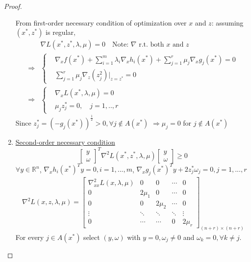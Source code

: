 \documentclass[11pt,a4paper]{article}
\begin{document}
\begin{proof}
\begin{enumerate}[(1)]
    From first-order necessary condition of optimization over $x$ and $z$: assuming $(x^*,z^*)$ is regular,
    \begin{equation}
        \begin{aligned}
            &\nabla L(x^*,z^*,\lambda,\mu)=0\quad \text{Note: $\nabla$ r.t. both $x$ and $z$}\\
            \Rightarrow	&
            \left\{\begin{matrix}
                &\nabla_x f(x^*)+\sum_{i=1}^m \lambda_i \nabla_x h_i(x^*)+\sum_{j=1}^r \mu_j \nabla_x g_j(x^*)=0\\
                &\sum_{j=1}^r \mu_j \nabla_z (z_j^2)|_{z=z^*}=0
            \end{matrix}\right.\\
            \Rightarrow	&
            \left\{\begin{matrix}
                &\nabla_x L(x^*,\lambda,\mu)=0\\
                &\mu_jz_j^*=0,\quad j=1,..,r
            \end{matrix}\right.
        \end{aligned}
        \nonumber
    \end{equation}
    Since $z_j^*=(-g_j(x^*))^{\frac{1}{2}}>0,\forall j\notin A(x^*)$ $\Rightarrow \mu_j=0$ for $j\notin A(x^*)$
    \item \underline{Second-order necessary condition}
    $$\begin{bmatrix}
        y\\
        \omega
    \end{bmatrix}^T \nabla^2L(x^*,z^*,\lambda,\mu)\begin{bmatrix}
        y\\
        \omega
    \end{bmatrix}\geq 0$$
    $\forall y\in \mathbb{R}^n$, $\nabla_x h_i(x^*)^Ty=0,i=1,...,m$, $\nabla_x g_j(x^*)^Ty+2z_j^*\omega_j=0,j=1,...,r$
    \begin{equation}
        \begin{aligned}
            \nabla^2 L(x,z,\lambda,\mu)=\begin{bmatrix}
                \nabla^2_{xx} L(x,\lambda,\mu)&0&0&\cdots&0\\
                0&2\mu_1&0&\cdots&0\\
                0&0&2\mu_2&\cdots&0\\
                \vdots&\ddots&\ddots&\ddots&\vdots\\
                0&\cdots&\cdots&0&2\mu_r
            \end{bmatrix}_{(n+r)\times(n+r)}
        \end{aligned}
        \nonumber
    \end{equation}
    For every $j\in A(x^*)$ select $(y,\omega)$ with $y=0,\omega_j\neq 0$ and $\omega_k=0,\forall k\neq j$.
    

\end{enumerate}
\end{proof}
\end{document}
